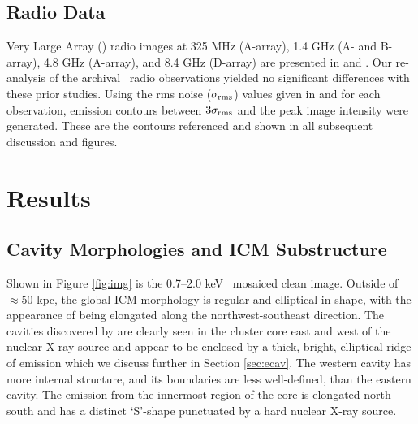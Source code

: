 \documentclass[iop]{emulateapj}
\begin{document}
\subsection{Radio Data}
\label{sec:radio}

Very Large Array (\vla) radio images at 325 MHz (A-array), 1.4 GHz (A-
and B-array), 4.8 GHz (A-array), and 8.4 GHz (D-array) are presented
in \citet{gitti06} and \citet{birzan08}. Our re-analysis of the
archival \vla\ radio observations yielded no significant differences
with these prior studies. Using the rms noise ($\sigma_{\rm{rms}}$)
values given in \citet{gitti06} and \citet{birzan08} for each
observation, emission contours between $3\sigma_{\rm{rms}}$ and the
peak image intensity were generated. These are the contours referenced
and shown in all subsequent discussion and figures.

\section{Results}
\label{sec:results}

\subsection{Cavity Morphologies and ICM Substructure}
\label{sec:morph}

Shown in Figure \ref{fig:img} is the 0.7--2.0 keV \cxo\ mosaiced clean
image. Outside of $\approx 50$ kpc, the global ICM morphology is
regular and elliptical in shape, with the appearance of being
elongated along the northwest-southeast direction. The cavities
discovered by \citet{schindler01} are clearly seen in the cluster core
east and west of the nuclear X-ray source and appear to be enclosed by
a thick, bright, elliptical ridge of emission which we discuss further
in Section \ref{sec:ecav}. The western cavity has more internal
structure, and its boundaries are less well-defined, than the eastern
cavity. The emission from the innermost region of the core is
elongated north-south and has a distinct `S'-shape punctuated by a
hard nuclear X-ray source.
\end{document}
